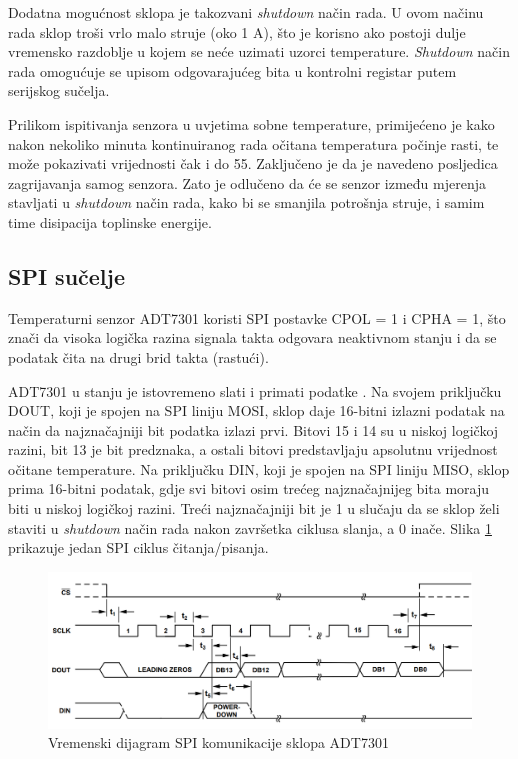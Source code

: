             Dodatna mogućnost sklopa je takozvani \textit{shutdown} način rada. U ovom načinu rada sklop troši vrlo malo struje (oko 1 \textmu{}A), što je korisno ako postoji dulje vremensko razdoblje u kojem se neće uzimati uzorci temperature. \textit{Shutdown} način rada omogućuje se upisom odgovarajućeg bita u kontrolni registar putem serijskog sučelja.
            
            Prilikom ispitivanja senzora u uvjetima sobne temperature, primijećeno je kako nakon nekoliko minuta kontinuiranog rada očitana temperatura počinje rasti, te može pokazivati vrijednosti čak i do 55\textcelsius{}. Zaključeno je da je navedeno posljedica zagrijavanja samog senzora. Zato je odlučeno da će se senzor između mjerenja stavljati u \textit{shutdown} način rada, kako bi se smanjila potrošnja struje, i samim time disipacija toplinske energije.

        \subsection{SPI sučelje}
            Temperaturni senzor ADT7301 koristi SPI postavke CPOL = 1 i CPHA = 1, što znači da visoka logička razina signala takta odgovara neaktivnom stanju i da se podatak čita na drugi brid takta (rastući).
            
            ADT7301 u stanju je istovremeno slati i primati podatke . Na svojem priključku DOUT, koji je spojen na SPI liniju MOSI, sklop daje 16-bitni izlazni podatak na način da najznačajniji bit podatka izlazi prvi. Bitovi 15 i 14 su u niskoj logičkoj razini, bit 13 je bit predznaka, a ostali bitovi predstavljaju apsolutnu vrijednost očitane temperature. Na priključku DIN, koji je spojen na SPI liniju MISO, sklop prima 16-bitni podatak, gdje svi bitovi osim trećeg najznačajnijeg bita moraju biti u niskoj logičkoj razini. Treći najznačajniji bit je 1 u slučaju da se sklop želi staviti u \textit{shutdown} način rada nakon završetka ciklusa slanja, a 0 inače. Slika \ref{fig:adt7301_spi} prikazuje jedan SPI ciklus čitanja/pisanja.
            
            \begin{figure}[htb]
                \centering
                \includegraphics[width=\textwidth]{slike/ADT7301_spi.png}
                \caption{Vremenski dijagram SPI komunikacije sklopa ADT7301 \cite{adt7301_datasheet}}
                \label{fig:adt7301_spi}
            \end{figure}
                